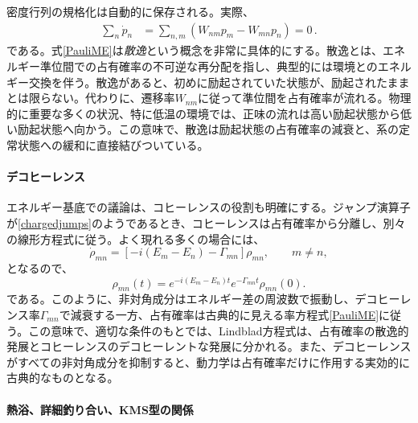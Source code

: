 \documentclass[a4paper,11pt,oneside]{article}
\theoremstyle{definition}
\numberwithin{equation}{section}
\begin{document}
密度行列の規格化は自動的に保存される。実際、
\begin{align}
\sum_n \dot p_n
&=
\sum_{n,m}
\left(
W_{nm}p_m - W_{mn}p_n
\right)
=0 \,.
\end{align}
である。式\eqref{PauliME}は\textit{散逸}という概念を非常に具体的にする。散逸とは、エネルギー準位間での占有確率の不可逆な再分配を指し、典型的には環境とのエネルギー交換を伴う。散逸があると、初めに励起されていた状態が、励起されたままとは限らない。代わりに、遷移率$W_{nm}$に従って準位間を占有確率が流れる。物理的に重要な多くの状況、特に低温の環境では、正味の流れは高い励起状態から低い励起状態へ向かう。この意味で、散逸は励起状態の占有確率の減衰と、系の定常状態への緩和に直接結びついている。





\paragraph{デコヒーレンス} エネルギー基底での議論は、コヒーレンスの役割も明確にする。ジャンプ演算子が\eqref{chargedjumps}のようであるとき、コヒーレンスは占有確率から分離し、別々の線形方程式に従う。よく現れる多くの場合には、
\begin{equation}
\dot \rho_{mn}
=
\left[
-i(E_m-E_n)-\Gamma_{mn}
\right]\rho_{mn},
\qquad
m\neq n ,
\end{equation}
となるので、
\begin{equation}
\rho_{mn}(t)
=
e^{-i(E_m-E_n)t}e^{-\Gamma_{mn}t}\rho_{mn}(0) .
\end{equation}
である。このように、非対角成分はエネルギー差の周波数で振動し、デコヒーレンス率$\Gamma_{mn}$で減衰する一方、占有確率は古典的に見える率方程式\eqref{PauliME}に従う。この意味で、適切な条件のもとでは、Lindblad方程式は、占有確率の散逸的発展とコヒーレンスのデコヒーレントな発展に分かれる。また、デコヒーレンスがすべての非対角成分を抑制すると、動力学は占有確率だけに作用する実効的に古典的なものとなる。






\paragraph{熱浴、詳細釣り合い、KMS型の関係}
\end{document}
